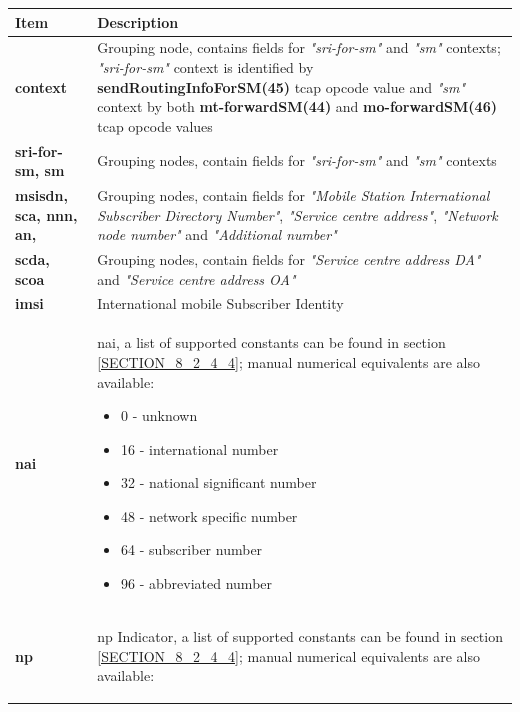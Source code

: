 \documentclass[a4paper,latin]{paper}
\begin{document}
\begin{tabularx}{\textwidth}{ | l | X |}
	\hline
	Item	 				& Description \\
	\hline
	\textbf{context}			& Grouping node, contains fields for \textit{"sri-for-sm"} and \textit{"sm"} contexts; \textit{"sri-for-sm"} context is identified by 
						  \textbf{sendRoutingInfoForSM(45)} \acrshort{tcap} opcode value and \textit{"sm"} context by both \textbf{mt-forwardSM(44)} and 
						  \textbf{mo-forwardSM(46)} \acrshort{tcap} opcode values  \\ 
	\textbf{sri-for-sm, sm}			& Grouping nodes, contain fields for \textit{"sri-for-sm"} and \textit{"sm"} contexts \\
	\textbf{msisdn, sca, nnn, an,}		& Grouping nodes, contain fields for \textit{"Mobile Station International Subscriber Directory Number"}, \textit{"Service centre address"}, \textit{"Network node number"} and \textit{"Additional number"} \\
	\textbf{scda, scoa}			& Grouping nodes, contain fields for \textit{"Service centre address DA"} and \textit{"Service centre address OA"} \\
	\textbf{imsi}				& International mobile Subscriber Identity \\
	\textbf{nai}				& \acrfull{nai}, a list of supported constants can be found in
                                                  section \ref{SECTION_8_2_4_4}; manual numerical equivalents are also available: 
	  					  \begin{itemize}
						  	\setlength{\itemsep}{0pt}
							\setlength{\parskip}{0pt}
							\setlength{\parsep}{0pt}
							\item 0 - unknown
							\item 16 - international number
							\item 32 - national significant number
							\item 48 - network specific number
							\item 64 - subscriber number
							\item 96 - abbreviated number
						    \end{itemize} \\ 
	\textbf{np}				& \acrfull{np} Indicator, a list of supported constants can be found in
                                                  section \ref{SECTION_8_2_4_4}; manual numerical equivalents are also available: 
	  					  \begin{itemize}
						  	\setlength{\itemsep}{0pt}
							\setlength{\parskip}{0pt}
							\setlength{\parsep}{0pt}

\end{itemize}
\end{tabularx}
\end{document}
